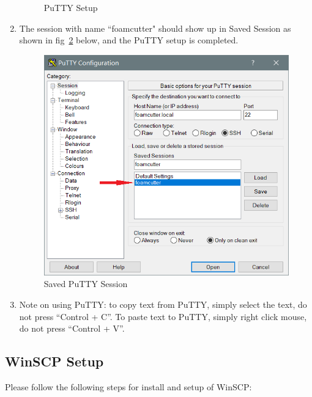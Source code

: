 \documentclass[titlepage,12pt,letter]{report}
\numberwithin{equation}{chapter}
\begin{document}
\begin{enumerate}[noitemsep,topsep=0pt]
\begin{figure} [H]
		\caption{PuTTY Setup}
		\label{fig:putty2}
	\end{figure}
	\item The session with name ``foamcutter" should show up in Saved Session as shown in fig~\ref{fig:putty3} below, and the PuTTY setup is completed.
	\begin{figure} [H]
		\includegraphics[width = 0.6\linewidth]{./Figures/Laptop_Setup/putty3.png}
		\caption{Saved PuTTY Session}
		\label{fig:putty3}
	\end{figure}
	\item Note on using PuTTY: to copy text from PuTTY, simply select the text, do not press ``Control + C''. To paste text to PuTTY, simply right click mouse, do not press ``Control + V''.
\end{enumerate}

\subsection{WinSCP Setup}

\noindent Please follow the following steps for install and setup of WinSCP:
\end{document}

